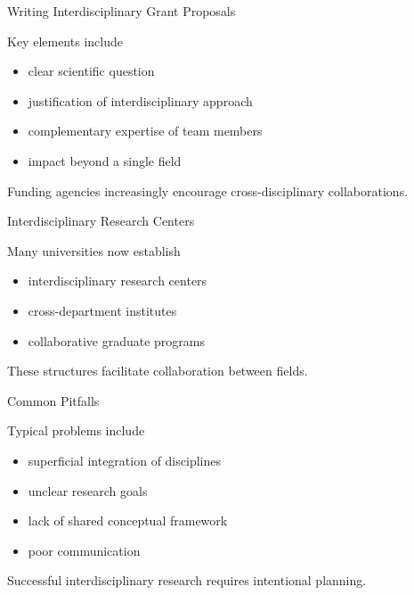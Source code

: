 \documentclass{beamer}
\begin{document}

\begin{frame}{Writing Interdisciplinary Grant Proposals}

Key elements include

\begin{itemize}
\item clear scientific question
\item justification of interdisciplinary approach
\item complementary expertise of team members
\item impact beyond a single field
\end{itemize}

Funding agencies increasingly encourage
cross-disciplinary collaborations.

\end{frame}


\begin{frame}{Interdisciplinary Research Centers}

Many universities now establish

\begin{itemize}
\item interdisciplinary research centers
\item cross-department institutes
\item collaborative graduate programs
\end{itemize}

These structures facilitate collaboration
between fields.

\end{frame}


\begin{frame}{Common Pitfalls}

Typical problems include

\begin{itemize}
\item superficial integration of disciplines
\item unclear research goals
\item lack of shared conceptual framework
\item poor communication
\end{itemize}

Successful interdisciplinary research requires
intentional planning.

\end{frame}
\end{document}
